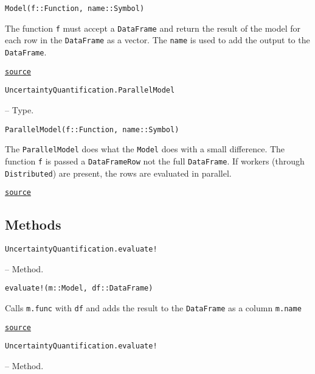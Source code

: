 \begin{adjustwidth}{2em}{0pt}


\begin{verbatim}
Model(f::Function, name::Symbol)
\end{verbatim}

The function \texttt{f} must accept a \texttt{DataFrame} and return the result of the model for each row in the \texttt{DataFrame} as a vector. The \texttt{name} is used to add the output to the \texttt{DataFrame}.



\href{https://github.com/friesischscott/UncertaintyQuantification.jl/blob/f5ee6cce729f0d6a57979257379c942cdf42f86f/src/models/model.jl#L1-L6}{\texttt{source}}


\end{adjustwidth}
\hypertarget{1457344338231328694}{\texttt{UncertaintyQuantification.ParallelModel}}  -- {Type.}

\begin{adjustwidth}{2em}{0pt}


\begin{verbatim}
ParallelModel(f::Function, name::Symbol)
\end{verbatim}

The  \texttt{ParallelModel}  does what the \texttt{Model} does with a small difference. The function \texttt{f} is passed a \texttt{DataFrameRow} not the full \texttt{DataFrame}. If workers (through \texttt{Distributed}) are present, the rows are evaluated in parallel.



\href{https://github.com/friesischscott/UncertaintyQuantification.jl/blob/f5ee6cce729f0d6a57979257379c942cdf42f86f/src/models/model.jl#L12-L18}{\texttt{source}}


\end{adjustwidth}

\subsection{Methods}



\label{15695795754956981461}{}

\hypertarget{13118330489865978658}{\texttt{UncertaintyQuantification.evaluate!}}  -- {Method.}

\begin{adjustwidth}{2em}{0pt}


\begin{verbatim}
evaluate!(m::Model, df::DataFrame)
\end{verbatim}

Calls \texttt{m.func} with \texttt{df} and adds the result to the \texttt{DataFrame} as a column \texttt{m.name}



\href{https://github.com/friesischscott/UncertaintyQuantification.jl/blob/f5ee6cce729f0d6a57979257379c942cdf42f86f/src/models/model.jl#L32-L36}{\texttt{source}}


\end{adjustwidth}
\hypertarget{16576970544334108695}{\texttt{UncertaintyQuantification.evaluate!}}  -- {Method.}

